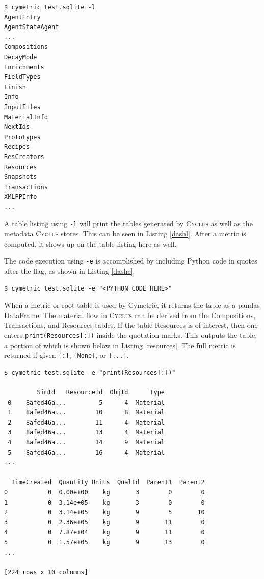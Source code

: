 \documentclass{anstrans}
\newcommand{\cyclus}{\textsc{Cyclus}\xspace}
\newcommand{\code}[1]{{\color{code}\texttt{#1}}}
\begin{document}
\begin{lstlisting}[caption ={List of Tables in a Database}, label=dashl]
$ cymetric test.sqlite -l
AgentEntry
AgentStateAgent
...
Compositions
DecayMode
Enrichments
FieldTypes
Finish
Info
InputFiles
MaterialInfo
NextIds
Prototypes
Recipes
ResCreators
Resources
Snapshots
Transactions
XMLPPInfo
...
\end{lstlisting} 


A table listing using \code{-l} will print the tables generated by \cyclus 
as well as the metadata \cyclus stores. This can be seen in Listing 
\ref{dashl}. After a metric is computed, it shows up on the table 
listing here as well. 

The code execution using \code{-e} is accomplished by including 
Python code in quotes after the flag, as shown in Listing \ref{dashe}. 

\begin{lstlisting}[caption ={Executing Code on a Database}, label=dashe]
$ cymetric test.sqlite -e "<PYTHON CODE HERE>"
\end{lstlisting} 

When a metric or root table is used by Cymetric, it returns the table 
as a pandas DataFrame. \cite{pandas0.15.2} The material flow in 
\cyclus can be derived from the Compositions, Transactions, and Resources 
tables. If the table Resources is of interest, 
then one enters \code{print(Resources[:])} inside the quotation marks. 
This outputs the table, a portion of which is shown below in Listing 
\ref{resources}. The full metric is returned if given \code{[:]}, 
\code{[None]}, or \code{[...]}. 

\begin{lstlisting}[caption={Printing a Root Table}, label=resources]
$ cymetric test.sqlite -e "print(Resources[:])"

         SimId   ResourceId  ObjId      Type  
 0    8afed46a...         5      4  Material   
 1    8afed46a...        10      8  Material   
 2    8afed46a...        11      4  Material   
 3    8afed46a...        13      4  Material   
 4    8afed46a...        14      9  Material   
 5    8afed46a...        16      4  Material   
...

  TimeCreated  Quantity Units  QualId  Parent1  Parent2  
0           0  0.00e+00    kg       3        0        0  
1           0  3.14e+05    kg       3        0        0  
2           0  3.14e+05    kg       9        5       10  
3           0  2.36e+05    kg       9       11        0  
4           0  7.87e+04    kg       9       11        0  
5           0  1.57e+05    kg       9       13        0  
...

[224 rows x 10 columns]
\end{lstlisting}
\end{document}
